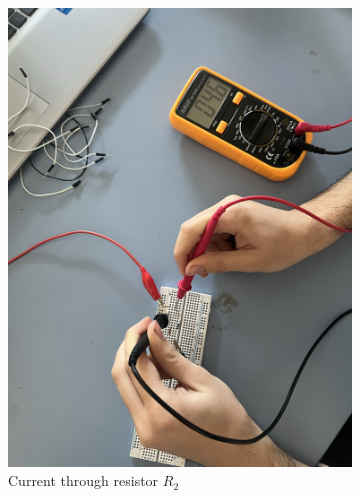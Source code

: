 \documentclass[a4paper, 10pt]{article}
\begin{document}
				\begin{figure}[h!]
					\centering
					\begin{subfigure}{.45\textwidth}
						\centering
						\includegraphics[width=\textwidth]{images/CurrentR2Circ3.jpeg}
						\caption{Current through resistor $R_2$}
						\label{subfig:CurrentR2Circ3}		
					\end{subfigure}
					\begin{subfigure}{.45\textwidth}
						\centering

\end{subfigure}
\end{figure}
\end{document}

